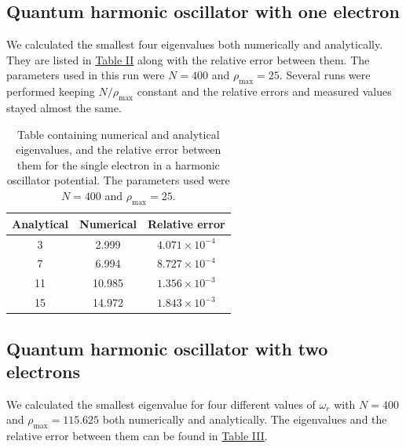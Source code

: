 \documentclass[reprint,english,notitlepage]{revtex4-1}  %
\begin{document}
\subsection{Quantum harmonic oscillator with one electron} \label{sec:IV:b}

We calculated the smallest four eigenvalues both numerically and analytically. They are listed in \hyperref[table:IV:b:1]{Table II} along with the relative error between them. The parameters used in this run were $N=400$ and $\rho_\text{max} = 25$. Several runs were performed keeping $N/\rho_\text{max}$ constant and the relative errors and measured values stayed almost the same.

\begin{table}[h!] \label{table:IV:b:1}
\caption{Table containing numerical and analytical eigenvalues, and the relative error between them for the single electron in a harmonic oscillator potential. The parameters used were $N=400$ and $\rho_\text{max} = 25$.}
\begin{tabular}{|c|c|c|}
\hline
Analytical & Numerical & Relative error \\
\hline
    3     &      2.999   &    $4.071 \times 10^{-4}$ \\
\hline
    7     &      6.994   &    $8.727 \times 10^{-4}$ \\
\hline
   11     &     10.985   &    $1.356 \times 10^{-3}$ \\
\hline
   15     &     14.972   &    $1.843 \times 10^{-3}$ \\
\hline
\end{tabular}
\end{table}


\subsection{Quantum harmonic oscillator with two electrons}\label{sec:IV:c}

We calculated the smallest eigenvalue for four different values of $\omega_r$ with $N=400$ and $\rho_\text{max} = 115.625$ both numerically and analytically. The eigenvalues and the relative error between them can be found in \hyperref[table:IV:c:1]{Table III}.
\end{document}

